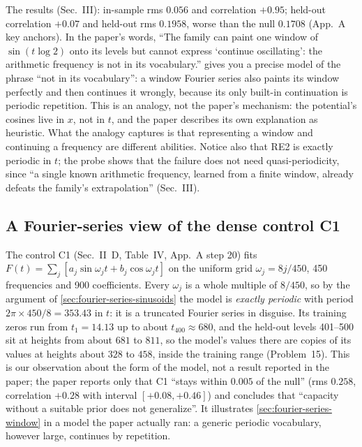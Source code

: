 The results (Sec.~III): in-sample rms $0.056$ and correlation $+0.95$; held-out correlation $+0.07$ and held-out rms $0.1958$, worse than the null $0.1708$ (App.~A key anchors). In the paper's words, ``The family can paint one window of $\sin(t\log 2)$ onto its levels but cannot express `continue oscillating': the arithmetic frequency is not in its vocabulary.''  gives you a precise model of the phrase ``not in its vocabulary'': a window Fourier series also paints its window perfectly and then continues it wrongly, because its only built-in continuation is periodic repetition. This is an analogy, not the paper's mechanism: the potential's cosines live in $x$, not in $t$, and the paper describes its own explanation as heuristic. What the analogy captures is that representing a window and continuing a frequency are different abilities. Notice also that RE2 is exactly periodic in $t$; the probe shows that the failure does not need quasi-periodicity, since ``a single known arithmetic frequency, learned from a finite window, already defeats the family's extrapolation'' (Sec.~III).

\subsection{A Fourier-series view of the dense control C1}

The control C1 (Sec.~II~D, Table~IV, App.~A step 20) fits $F(t)=\sum_j[a_j\sin\omega_jt+b_j\cos\omega_jt]$ on the uniform grid $\omega_j=8j/450$, 450 frequencies and 900 coefficients. Every $\omega_j$ is a whole multiple of $8/450$, so by the argument of \cref{sec:fourier-series-sinusoids} the model is \emph{exactly periodic} with period $2\pi\times450/8=353.43$ in $t$: it is a truncated Fourier series in disguise. Its training zeros run from $t_1=14.13$ up to about $t_{400}\approx680$, and the held-out levels 401--500 sit at heights from about $681$ to $811$, so the model's values there are copies of its values at heights about $328$ to $458$, inside the training range (Problem~15). This is our observation about the form of the model, not a result reported in the paper; the paper reports only that C1 ``stays within $0.005$ of the null'' (rms $0.258$, correlation $+0.28$ with interval $[+0.08,+0.46]$) and concludes that ``capacity without a suitable prior does not generalize''. It illustrates \cref{sec:fourier-series-window} in a model the paper actually ran: a generic periodic vocabulary, however large, continues by repetition.


